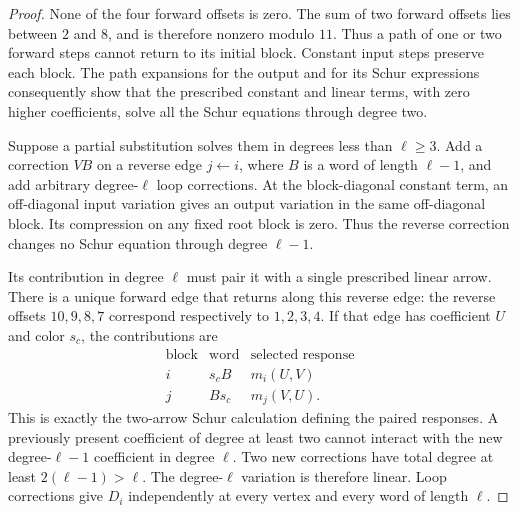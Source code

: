 \documentclass[11pt]{article}
\theoremstyle{definition}
\theoremstyle{remark}
\numberwithin{equation}{section}
\begin{document}
\begin{proof}
None of the four forward offsets is zero.  The sum of two forward offsets
lies between $2$ and $8$, and is therefore nonzero modulo $11$.
Thus a path of one or two forward steps cannot return to its initial block.
Constant input steps preserve each block.  The path expansions for the
output and for its Schur expressions consequently show that the prescribed
constant and linear terms, with zero higher coefficients, solve all the
Schur equations through degree two.

Suppose a partial substitution solves them in degrees less than
$\ell\ge3$.  Add a correction $V B$ on a reverse edge $j\leftarrow i$,
where $B$ is a word of length $\ell-1$, and add arbitrary degree-$\ell$
loop corrections.  At the block-diagonal constant term, an off-diagonal
input variation gives an output variation in the same off-diagonal block.
Its compression on any fixed root block is zero.  Thus the reverse
correction changes no Schur equation through degree $\ell-1$.

Its contribution in degree $\ell$ must pair it with a single prescribed
linear arrow.  There is a unique forward edge that returns along this
reverse edge: the reverse offsets $10,9,8,7$ correspond respectively to
$1,2,3,4$.  If that edge has coefficient $U$ and color $s_c$, the
contributions are
\begin{equation}
 \begin{array}{c|c|c}
 \text{block}&\text{word}&\text{selected response}\\ \hline
 i&s_cB&m_i(U,V)\\
 j&Bs_c&m_j(V,U).
 \end{array}
 \label{eq:correction-leading-pair}
\end{equation}
This is exactly the two-arrow Schur calculation defining the paired
responses.  A previously present coefficient of degree at least two
cannot interact with the new degree-$\ell-1$ coefficient in degree
$\ell$.  Two new corrections have total degree at least
$2(\ell-1)>\ell$.  The degree-$\ell$ variation is therefore linear.
Loop corrections give $D_i$ independently at every vertex and every
word of length $\ell$.


\end{proof}
\end{document}
